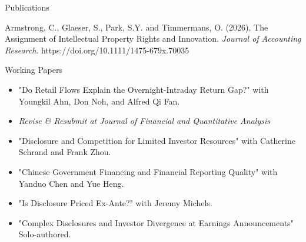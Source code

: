 \documentclass{resume} %
\newcommand{\MYhref}[3][blue]{\href{#2}{\color{#1}{#3}}}%
\begin{document}
\begin{rSection}{Publications}

Armstrong, C., Glaeser, S., Park, S.Y. and Timmermans, O. (2026), The Assignment of Intellectual Property Rights and Innovation. \textit{Journal of Accounting Research}. https://doi.org/10.1111/1475-679x.70035

\begin{rSection}{Working Papers}

\begin{itemize}
  \item {"Do Retail Flows Explain the Overnight-Intraday Return Gap?" with Youngkil Ahn, Don Noh, and Alfred Qi Fan.}
  \item[] \emph{Revise \& Resubmit at Journal of Financial and Quantitative Analysis}
\end{itemize}
\vspace{0.2cm}

\begin{itemize}
    \item {"Disclosure and Competition for Limited Investor Resources" with Catherine Schrand and Frank Zhou.}
\end{itemize}
\vspace{0.2cm}

\begin{itemize}
  \item {"Chinese Government Financing and Financial Reporting Quality" with Yanduo Chen and Yue Heng.} 
\end{itemize}
\end{rSection}
\vspace{0.2cm}

\begin{itemize}
  \item {"Is Disclosure Priced Ex-Ante?" with Jeremy Michels.} 
\end{itemize}
\vspace{0.2cm}

\begin{itemize}
  \item {"Complex Disclosures and Investor Divergence at Earnings Announcements" Solo-authored.}
\end{itemize}
\vspace{0.2cm}



\end{rSection}
\end{document}
